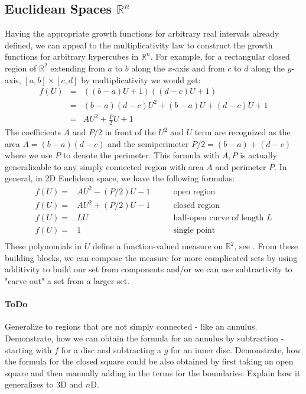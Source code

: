 \documentclass[12pt]{article}
\begin{document}
\subsection{Euclidean Spaces $\mathbb{R}^n$}
Having the appropriate growth functions for arbitrary real intervals already defined, we can appeal to the multiplicativity law to construct the growth functions for arbitrary hypercubes in $\mathbb{R}^n$. For example, for a rectangular closed region of $\mathbb{R}^2$ extending from $a$ to $b$ along the $x$-axis and from $c$ to $d$ along the $y$-axis, $[a,b] \times [c,d]$ by multiplicativity we would get: 
\begin{eqnarray}
 f(U) &=& ((b-a)U + 1) ((d-c)U + 1) \\
      &=& (b-a)(d-c)U^2 + (b-a)U + (d-c)U + 1 \\
      &=& A U^2 + \frac{P}{2} U + 1
\end{eqnarray}
The coefficients $A$ and $P/2$ in front of the $U^2$ and $U$ term are recognized as the area $A = (b-a)(d-c)$ and the semiperimeter $P/2 = (b-a) + (d-c)$ where we use $P$ to denote the perimeter. This formula with $A,P$ is actually generalizable to any simply connected region with area $A$ and perimeter $P$. In general, in 2D Euclidean space, we have the following formulas:
\begin{eqnarray}
f(U) =& A U^2 - (P/2) U - 1     & \qquad \text{open region} \\
f(U) =& A U^2 + (P/2) U - 1     & \qquad \text{closed region} \\
f(U) =& L U                     & \qquad \text{half-open curve of length } L \\
f(U) =& 1                       & \qquad \text{single point} \\
\end{eqnarray}
These polynomials in $U$ define a function-valued measure on $\mathbb{R}^2$, see \cite{MathTrain1}. From these building blocks, we can compose the measure for more complicated sets by using additivity to build our set from components and/or we can use subtractivity to "carve out" a set from a larger set.

\paragraph{ToDo} Generalize to regions that are not simply connected - like an annulus. Demonstrate, how we can obtain the formula for an annulus by subtraction - starting with $f$ for a disc and subtracting a $g$ for an inner disc. Demonstrate, how the formula for the closed square could be also obtained by first taking an open square and then manually adding in the terms for the boundaries. Explain how it generalizes to 3D and $n$D.
\end{document}
